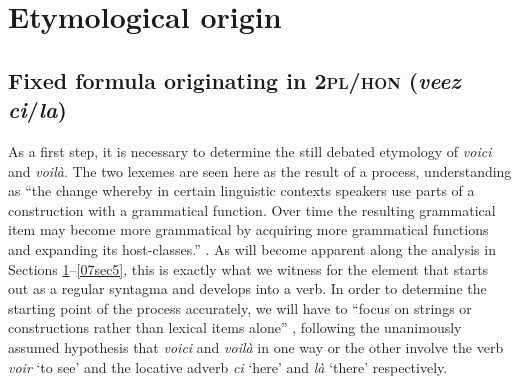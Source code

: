 \documentclass[output=paper,colorlinks,citecolor=brown]{langscibook}
\begin{document}
\section{Etymological origin} \label{07sec3}

\subsection{Fixed formula originating in \textsc{2pl/hon} (\emph{veez ci}/\emph{la})} \label{07sec3.1}

As a first step, it is necessary to determine the still debated etymology of \emph{voici} and \emph{voilà}. The two lexemes are seen here as the result of a  process, understanding  as ``the change whereby in certain linguistic contexts speakers use parts of a construction with a grammatical function. Over time the resulting grammatical item may become more grammatical by acquiring more grammatical functions and expanding its host-classes.'' \citep[145]{brintontraugott2005}. As will become apparent along the analysis in Sections \ref{07sec3}--\ref{07sec5}, this is exactly what we witness for the   element that starts out as a regular syntagma and develops into a verb. In order to determine the starting point of the process accurately, we will have to ``focus on strings or constructions rather than lexical items alone'' \citep[645]{traugott2003}, following the unanimously assumed hypothesis that \emph{voici} and \emph{voilà} in one way or the other involve the verb \emph{voir} `to see' and the locative adverb \emph{ci} `here' and \emph{là} `there' respectively.
\end{document}
